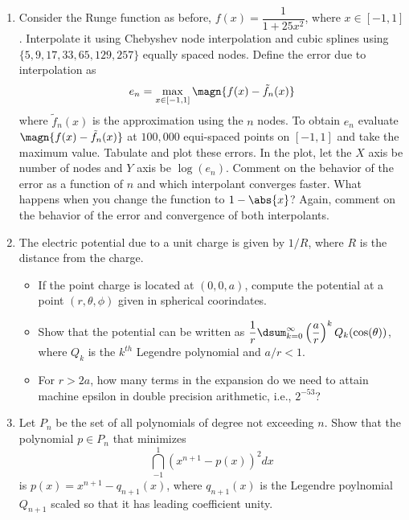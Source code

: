 \documentclass{article}
\begin{document}
	\begin{enumerate}
		\item
		Consider the Runge function as before, $f(x) = \dfrac1{1+25x^2}$, where $x \in [-1,1]$. Interpolate it using Chebyshev node interpolation and cubic splines using $\{5,9,17,33,65,129,257\}$ equally spaced nodes. Define the error due to interpolation as $$e_n = \max_{x \in [-1,1]}\magn{f(x)-\tilde{f}_n(x)}$$ where $\tilde{f}_n(x)$ is the approximation using the $n$ nodes. To obtain $e_n$ evaluate $\magn{f(x)-\tilde{f}_n(x)}$ at $100,000$ equi-spaced points on $[-1,1]$ and take the maximum value. Tabulate and plot these errors. In the plot, let the $X$ axis be number of nodes and $Y$ axis be $\log(e_n)$. Comment on the behavior of the error as a function of $n$ and which interpolant converges faster. What happens when you change the function to $1-\abs{x}$? Again, comment on the behavior of the error and convergence of both interpolants.
		\item
		The electric potential due to a unit charge is given by $1/R$, where $R$ is the distance from the charge.
		\begin{itemize}
			\item
			If the point charge is located at $(0,0,a)$, compute the potential at a point $(r,\theta,\phi)$ given in spherical coorindates.
			\item
			Show that the potential can be written as $\dfrac1r \dsum_{k=0}^{\infty} \left(\dfrac{a}r\right)^k Q_k(\cos(\theta))$, where $Q_k$ is the $k^{th}$ Legendre polynomial and $a/r < 1$.
			\item
			For $r>2a$, how many terms in the expansion do we need to attain machine epsilon in double precision arithmetic, i.e., $2^{-53}$?
		\end{itemize}
		\item
		Let $P_n$ be the set of all polynomials of degree not exceeding $n$. Show that the polynomial $p \in P_n$ that minimizes
		$$\dint_{-1}^1 \left(x^{n+1}-p(x)\right)^2 dx$$
		is $p(x) = x^{n+1}-q_{n+1}(x)$, where $q_{n+1}(x)$ is the Legendre poylnomial $Q_{n+1}$ scaled so that it has leading coefficient unity.
	\end{enumerate}
\end{document}
